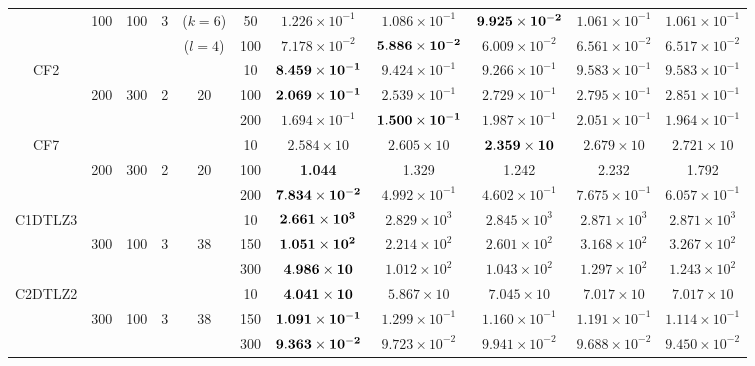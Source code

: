 \documentclass[../main/main]{subfiles}
\begin{document}
\begin{table}[htbp]
\begin{tabular}{c|ccccc|c|c|c|c|c}
  				   & 100 & 100 & 3 & ($k=6$) &50 & $ 1.226 \times 10^{-1} $ & $1.086  \times 10^{-1}$ & $\bf{9.925  \times 10^{-2}}$ & $1.061  \times 10^{-1}$ & $1.061  \times 10^{-1}$\\
				   &        &       && ($l=4$) &100 & $7.178 \times 10^{-2}$ & $\bf{5.886 \times 10^{-2}}$ & $6.009 \times 10^{-2}$ & $6.561 \times 10^{-2}$ & $6.517 \times 10^{-2}$\\
\hline
\multirow{3}{*}{CF2}&        &     &&  & 10 & $\bf{8.459 \times 10^{-1}}$ &  $9.424 \times 10^{-1}$ & $9.266 \times 10^{-1}$ & $9.583 \times 10^{-1}$ & $9.583 \times 10^{-1}$\\
  				   & 200 & 300 &2 & 20 & 100 &$\bf{2.069 \times 10^{-1}}$ &  $2.539 \times 10^{-1}$ & $2.729 \times 10^{-1}$ & $2.795 \times 10^{-1}$ & $2.851 \times 10^{-1}$\\
				   &        &     &&   &200 & $1.694 \times 10^{-1}$ & $\bf{1.500 \times 10^{-1}}$ & $1.987 \times 10^{-1}$ & $2.051 \times 10^{-1}$ & $1.964 \times 10^{-1}$\\
\hline
\multirow{3}{*}{CF7} &        &    &&   & 10 & $2.584 \times 10$ & $2.605 \times 10$ &  $\bf{2.359 \times 10}$ & $2.679 \times 10$ & $2.721 \times 10$\\
  				   & 200 & 300 &2 & 20 &100 & \bf{1.044} & 1.329 &  1.242  & 2.232 & 1.792 \\
				   &        &     &&   &200 & $\bf{7.834 \times 10^{-2}}$ &  $4.992 \times 10^{-1}$ & $4.602 \times 10^{-1}$ & $7.675 \times 10^{-1}$ & $6.057 \times 10^{-1}$\\

\hline
\multirow{3}{*}{C1DTLZ3} &       && &       & 10 &  $\bf{2.661 \times 10^{3}}$ & $2.829 \times 10^{3}$ &  $2.845 \times 10^{3}$ & $2.871 \times 10^{3}$ & $2.871 \times 10^{3}$\\
                                          &300 & 100 &3 & 38 & 150 & $\bf{1.051 \times 10^{2}}$ & $2.214 \times 10^{2}$ &  $2.601 \times 10^{2}$ & $3.168 \times 10^{2}$ & $3.267 \times 10^{2}$\\
				   &        &       && &300 &  $\bf{4.986 \times 10}$ & $1.012 \times 10^{2}$ &  $1.043 \times 10^{2}$ & $1.297 \times 10^{2}$ & $1.243 \times 10^{2}$\\
\hline
\multirow{3}{*}{C2DTLZ2} &  &&      &       & 10 & $\bf{4.041 \times 10}$ & $5.867 \times 10$ &  $7.045 \times 10$ & $7.017 \times 10$ & $7.017 \times 10$\\
  				   & 300 & 100 & 3 & 38&150 & $\bf{1.091 \times 10^{-1}}$ &  $1.299 \times 10^{-1}$ & $1.160 \times 10^{-1}$ & $1.191 \times 10^{-1}$ & $1.114 \times 10^{-1}$\\
		convex		   &        &     &&   &300 &  $\bf{9.363 \times 10^{-2}}$ & $9.723 \times 10^{-2}$ & $9.941 \times 10^{-2}$ & $9.688 \times 10^{-2}$ & $9.450 \times 10^{-2}$\\


\end{tabular}
\end{table}
\end{document}
